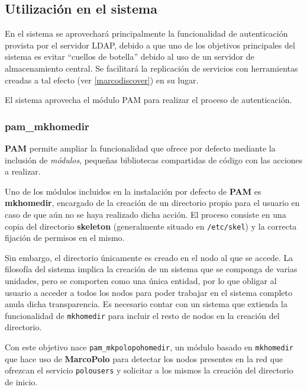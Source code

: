 \subsection{Utilización en el sistema}

En el sistema se aprovechará principalmente la funcionalidad de autenticación provista por el servidor LDAP, debido a que uno de los objetivos principales del sistema es evitar ``cuellos de botella'' debido al uso de un servidor de almacenamiento central. Se facilitará la replicación de servicios con herramientas creadas a tal efecto (ver \ref{marcodiscover}) en su lugar.%

El sistema aprovecha el módulo PAM para realizar el proceso de autenticación.

\subsubsection{pam\_mkhomedir}
\label{pam_mkpolohomedir}

\textbf{PAM} permite ampliar la funcionalidad que ofrece por defecto mediante la inclusión de \textit{módulos}, pequeñas bibliotecas compartidas de código con las acciones a realizar.

Uno de los módulos incluidos en la instalación por defecto de \textbf{PAM} es \textbf{mkhomedir}, encargado de la creación de un directorio propio para el usuario en caso de que aún no se haya realizado dicha acción. El proceso consiste en una copia del directorio \textbf{skeleton} (generalmente situado en \texttt{/etc/skel}) y la correcta fijación de permisos en el mismo.

Sin embargo, el directorio únicamente es creado en el nodo al que se accede. La filosofía del sistema implica la creación de un sistema que se componga de varias unidades, pero se comporten como una única entidad, por lo que obligar al usuario a acceder a todos los nodos para poder trabajar en el sistema completo anula dicha transparencia. Es necesario contar con un sistema que extienda la funcionalidad de \texttt{mkhomedir} para incluir el resto de nodos en la creación del directorio.

Con este objetivo nace \texttt{pam\_mkpolopohomedir}, un módulo basado en \texttt{mkhomedir} que hace uso de \textbf{MarcoPolo} para detectar los nodos presentes en la red que ofrezcan el servicio \texttt{polousers} y solicitar a los mismos la creación del directorio de inicio.

